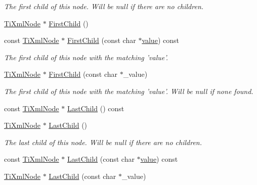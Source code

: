 \begin{DoxyCompactItemize}
\begin{DoxyCompactList}\small\item\em The first child of this node. Will be null if there are no children. \item\end{DoxyCompactList}\item 
\hyperlink{classTiXmlNode}{TiXmlNode} $\ast$ \hyperlink{classTiXmlNode_a5e97d69b7c0ebd27fb7286be56559b77}{FirstChild} ()
\item 
const \hyperlink{classTiXmlNode}{TiXmlNode} $\ast$ \hyperlink{classTiXmlNode_ab5f722624113c8203227de4f56576d31}{FirstChild} (const char $\ast$\hyperlink{classTiXmlNode_aead528b3cedc33c16a6c539872c7cc8b}{value}) const 
\begin{DoxyCompactList}\small\item\em The first child of this node with the matching 'value'. \item\end{DoxyCompactList}\item 
\hyperlink{classTiXmlNode}{TiXmlNode} $\ast$ \hyperlink{classTiXmlNode_abc8bf32be6419ec453a731868de19554}{FirstChild} (const char $\ast$\_\-value)
\begin{DoxyCompactList}\small\item\em The first child of this node with the matching 'value'. Will be null if none found. \item\end{DoxyCompactList}\item 
const \hyperlink{classTiXmlNode}{TiXmlNode} $\ast$ \hyperlink{classTiXmlNode_a6d671107e00cca1d28cb2d7f3a87a21e}{LastChild} () const 
\item 
\hyperlink{classTiXmlNode}{TiXmlNode} $\ast$ \hyperlink{classTiXmlNode_a6432d2b2495f6caf9cb4278df706a031}{LastChild} ()
\begin{DoxyCompactList}\small\item\em The last child of this node. Will be null if there are no children. \item\end{DoxyCompactList}\item 
const \hyperlink{classTiXmlNode}{TiXmlNode} $\ast$ \hyperlink{classTiXmlNode_acdd3fdc436aa7433023310a041e5e63f}{LastChild} (const char $\ast$\hyperlink{classTiXmlNode_aead528b3cedc33c16a6c539872c7cc8b}{value}) const 
\item 
\hyperlink{classTiXmlNode}{TiXmlNode} $\ast$ \hyperlink{classTiXmlNode_abad5bf1059c48127b958711ef89e8e5d}{LastChild} (const char $\ast$\_\-value)

\end{DoxyCompactItemize}
